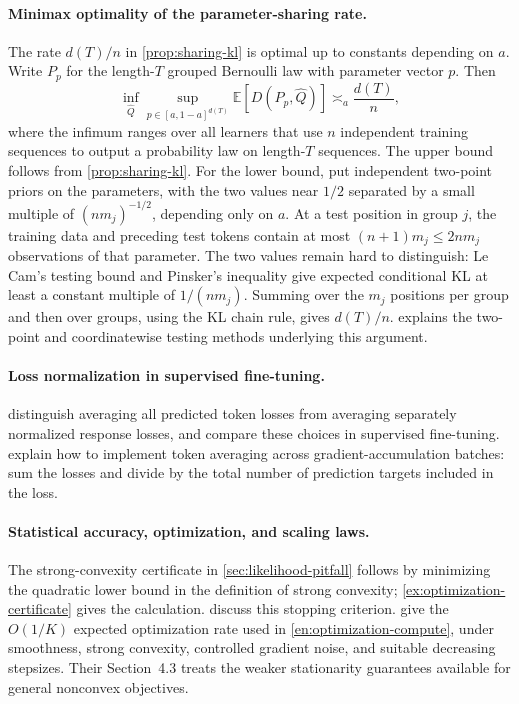 \documentclass[11pt,twoside]{article}
\newcommand{\E}{\mathbb E}
\newcommand{\KL}{D}
\theoremstyle{definition}
\theoremstyle{remark}
\begin{document}
\paragraph{Minimax optimality of the parameter-sharing rate.}
\label{note:sharing-minimax}
The rate \(d(T)/n\) in \cref{prop:sharing-kl} is optimal up to
constants depending on \(a\). Write \(P_p\) for the length-\(T\)
grouped Bernoulli law with parameter vector \(p\). Then
\[
 \inf_{\widehat Q}\sup_{p\in[a,1-a]^{d(T)}}
 \E[\KL(P_p,\widehat Q)]\asymp_a\frac{d(T)}n,
\]
where the infimum ranges over all learners that use \(n\) independent
training sequences to output a probability law on length-\(T\) sequences.
The upper bound follows from \cref{prop:sharing-kl}.
For the lower bound, put independent two-point priors on the
parameters, with the two values near \(1/2\) separated by a small
multiple of \((nm_j)^{-1/2}\), depending only on \(a\).
At a test position in group \(j\),
the training data and preceding test tokens contain at most
\((n+1)m_j\le2nm_j\) observations of that parameter.
The two values remain hard to distinguish: Le Cam's testing bound
and Pinsker's inequality give expected conditional KL at least a
constant multiple of \(1/(nm_j)\). Summing over the \(m_j\) positions per group
and then over groups, using the KL chain rule, gives \(d(T)/n\).
\citet{yu1997} explains the two-point and coordinatewise testing
methods underlying this argument.

\paragraph{Loss normalization in supervised fine-tuning.}
\label{note:sft-normalization}
\citet[Section~4.3, Eq.~(6)]{yao2025} distinguish averaging all predicted
token losses from averaging separately normalized response losses, and
compare these choices in supervised fine-tuning. \citet{hf2024loss}
explain how to implement token averaging across gradient-accumulation
batches: sum the losses and divide by the total number of prediction
targets included in the loss.

\paragraph{Statistical accuracy, optimization, and scaling laws.}
\label{note:optimization-accuracy}
The strong-convexity certificate in \cref{sec:likelihood-pitfall} follows
by minimizing the quadratic lower bound in the definition of strong
convexity; \cref{ex:optimization-certificate} gives the calculation.
\citet[Section~9.1.2]{boyd2004} discuss this stopping criterion.
\citet[Theorem~4.7]{bottou2018} give the \(O(1/K)\) expected optimization
rate used in \cref{en:optimization-compute}, under smoothness, strong
convexity, controlled gradient noise, and suitable decreasing stepsizes.
Their Section~4.3 treats the weaker stationarity guarantees available
for general nonconvex objectives.
\end{document}
